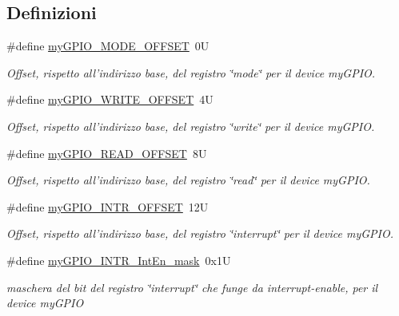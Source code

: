 \subsection*{Definizioni}
\begin{DoxyCompactItemize}
\item 
\#define \hyperlink{group__my_g_p_i_o_ga81a662103d6ed053978c0a9b4c273065}{my\+G\+P\+I\+O\+\_\+\+M\+O\+D\+E\+\_\+\+O\+F\+F\+S\+E\+T}~0\+U
\begin{DoxyCompactList}\small\item\em Offset, rispetto all'indirizzo base, del registro \char`\"{}mode\char`\"{} per il device my\+G\+P\+I\+O. \end{DoxyCompactList}\item 
\#define \hyperlink{group__my_g_p_i_o_ga2e45778b6ca9ce6f5768b3f7a4557ce1}{my\+G\+P\+I\+O\+\_\+\+W\+R\+I\+T\+E\+\_\+\+O\+F\+F\+S\+E\+T}~4\+U
\begin{DoxyCompactList}\small\item\em Offset, rispetto all'indirizzo base, del registro \char`\"{}write\char`\"{} per il device my\+G\+P\+I\+O. \end{DoxyCompactList}\item 
\#define \hyperlink{group__my_g_p_i_o_ga584d2dfece76e5762030d918d80592cc}{my\+G\+P\+I\+O\+\_\+\+R\+E\+A\+D\+\_\+\+O\+F\+F\+S\+E\+T}~8\+U
\begin{DoxyCompactList}\small\item\em Offset, rispetto all'indirizzo base, del registro \char`\"{}read\char`\"{} per il device my\+G\+P\+I\+O. \end{DoxyCompactList}\item 
\#define \hyperlink{group__my_g_p_i_o_gaacf2d8a21a051e778f02f8811b9c1e96}{my\+G\+P\+I\+O\+\_\+\+I\+N\+T\+R\+\_\+\+O\+F\+F\+S\+E\+T}~12\+U
\begin{DoxyCompactList}\small\item\em Offset, rispetto all'indirizzo base, del registro \char`\"{}interrupt\char`\"{} per il device my\+G\+P\+I\+O. \end{DoxyCompactList}\item 
\#define \hyperlink{group__my_g_p_i_o_ga0ba32e2adf874ed7216c5993369153e1}{my\+G\+P\+I\+O\+\_\+\+I\+N\+T\+R\+\_\+\+Int\+En\+\_\+mask}~0x1\+U
\begin{DoxyCompactList}\small\item\em maschera del bit del registro \char`\"{}interrupt\char`\"{} che funge da interrupt-\/enable, per il device my\+G\+P\+I\+O \end{DoxyCompactList}\item 

\end{DoxyCompactItemize}
